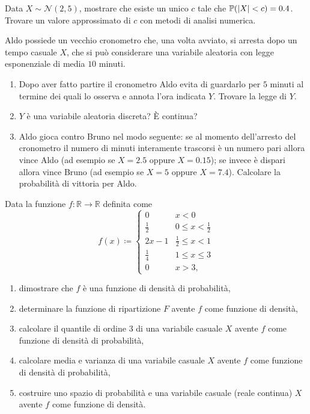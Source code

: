 Data $X\sim \mathcal{N}( 2,5)$, mostrare che esiste un unico $c$ tale che $\mathbb{P}(| X| < c) =0.4$. Trovare un valore approssimato di $c$ con metodi di analisi numerica.
\Esercizio{}

Aldo possiede un vecchio cronometro che, una volta avviato, si arresta dopo un tempo casuale $X$, che si può considerare una variabile aleatoria con legge esponenziale di media $10$ minuti.
\begin{enumerate}
\item Dopo aver fatto partire il cronometro Aldo evita di guardarlo per $5$ minuti al termine dei quali lo osserva e annota l'ora indicata $Y$. Trovare la legge di $Y$.
\item $Y$ è una variabile aleatoria discreta? È continua?
\item Aldo gioca contro Bruno nel modo seguente: se al momento dell'arresto del cronometro il numero di minuti interamente trascorsi è un numero pari allora vince Aldo (ad esempio se $X=2.5$ oppure $X=0.15$); se invece è dispari allora vince Bruno (ad esempio se $X=5$ oppure $X=7.4$). Calcolare la probabilità di vittoria per Aldo.
\end{enumerate}
\Esercizio{}

Data la funzione $f:\mathbb{R}\rightarrow \mathbb{R}$ definita come
\begin{equation*}
f( x) \coloneqq \begin{cases}
0 & x< 0\\
\frac{1}{2} & 0\leq x< \frac{1}{2}\\
2x-1 & \frac{1}{2} \leq x< 1\\
\frac{1}{4} & 1\leq x\leq 3\\
0 & x >3,
\end{cases}
\end{equation*}
\begin{enumerate}
\item dimostrare che $f$ è una funzione di densità di probabilità,
\item determinare la funzione di ripartizione $F$ avente $f$ come funzione di densità,
\item calcolare il quantile di ordine $3$ di una variabile casuale $X$ avente $f$ come funzione di densità di probabilità,
\item calcolare media e varianza di una variabile casuale $X$ avente $f$ come funzione di densità di probabilità,
\item costruire uno spazio di probabilità e una variabile casuale (reale continua) $X$ avente $f$ come funzione di densità.
\end{enumerate}


\ParteSoluzioni